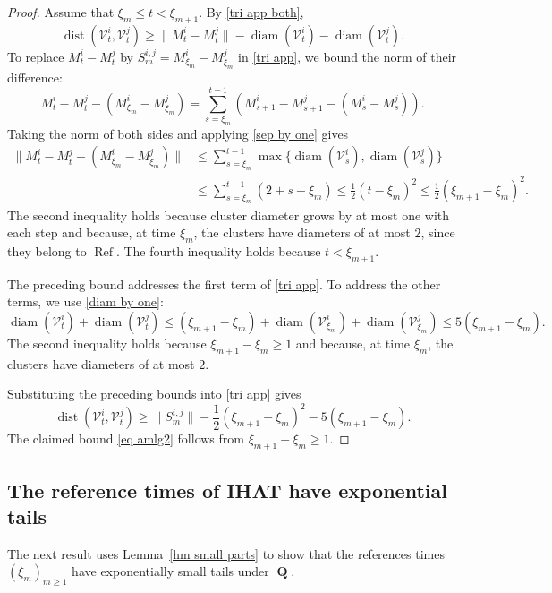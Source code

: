 \documentclass[11pt,reqno]{amsart}
\theoremstyle{definition}
\numberwithin{equation}{section}
\newcommand{\1}{\mathbf{1}}
\DeclareMathOperator{\dist}{dist}
\DeclareMathOperator{\diam}{diam}
\DeclareMathOperator{\PPprod}{\mathbf{Q}}
\DeclareMathOperator{\Refcon}{\mathrm{Ref}}
\newcommand{\VV}{\mathcal{V}}
\begin{document}
\begin{proof}
Assume that $\xi_m \leq t < \xi_{m+1}$. By \eqref{tri app both},
\begin{equation}\label{tri app}
\dist (\VV_t^i, \VV_t^j) \geq \|M_t^i - M_t^j\| - \diam (\VV_t^i) - \diam (\VV_t^j).
\end{equation}
To replace $M_t^i - M_t^j$ by $S_m^{i,j} = M_{\xi_m}^i - M_{\xi_m}^j$ in \eqref{tri app}, we bound the norm of their difference:
\begin{equation}\label{telesc}
M_t^i - M_t^j - (M_{\xi_m}^i - M_{\xi_m}^j) = \sum_{s = \xi_m}^{t-1} \left( M_{s+1}^i - M_{s+1}^j - (M_s^i - M_s^j) \right).
\end{equation}
Taking the norm of both sides and applying \eqref{sep by one} gives
\begin{align*}
\| M_t^i - M_t^j - (M_{\xi_m}^i - M_{\xi_m}^j) \| &\leq \sum_{s = \xi_m}^{t-1} \max \{\diam (\VV_s^i), \diam (\VV_s^j)\}\\ 
&\leq \sum_{s = \xi_m}^{t-1} (2+s-\xi_m) \leq \frac12 (t - \xi_m)^2 \leq \frac12 (\xi_{m+1} - \xi_m)^2.
\end{align*}
The second inequality holds because cluster diameter grows by at most one with each step and because, at time $\xi_m$, the clusters have diameters of at most $2$, since they belong to $\Refcon$. 
The fourth inequality holds because $t < \xi_{m+1}$.

The preceding bound addresses the first term of \eqref{tri app}. To address the other terms, we use \eqref{diam by one}:
\[
\diam (\VV_t^i) + \diam (\VV_t^j) \leq (\xi_{m+1} - \xi_m) + \diam (\VV_{\xi_m}^i) + \diam (\VV_{\xi_m}^j) \leq 5 (\xi_{m+1} - \xi_m).
\] 
The second inequality holds because $\xi_{m+1} - \xi_m \geq 1$ and because, at time $\xi_m$, the clusters have diameters of at most $2$.

Substituting the preceding bounds into \eqref{tri app} gives
\[
\dist (\VV_t^i, \VV_t^j) \geq \big\| S_m^{i,j} \big\| - \frac12 (\xi_{m+1} - \xi_m)^2 - 5 (\xi_{m+1} - \xi_m).
\]
The claimed bound \eqref{eq amlg2} follows from $\xi_{m+1} - \xi_m \geq 1$.
\end{proof}


\subsection{The reference times of IHAT have exponential tails}\label{exp tails}

The next result uses Lemma~\ref{hm small parts} to show that the references times $(\xi_m)_{m \geq 1}$ have exponentially small tails under $\PPprod$.
\end{document}
